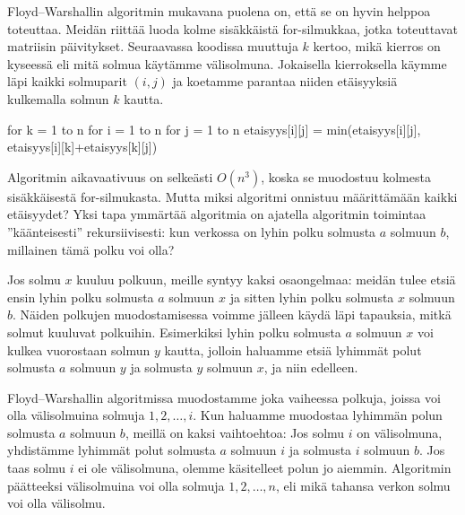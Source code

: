 Floyd–Warshallin algoritmin mukavana puolena on,
että se on hyvin helppoa toteuttaa.
Meidän riittää luoda kolme sisäkkäistä for-silmukkaa,
jotka toteuttavat matriisin päivitykset.
Seuraavassa koodissa muuttuja $k$ kertoo,
mikä kierros on kyseessä eli mitä solmua käytämme välisolmuna.
Jokaisella kierroksella käymme läpi kaikki solmuparit $(i,j)$
ja koetamme parantaa niiden etäisyyksiä kulkemalla solmun $k$ kautta.

\begin{code}
for k = 1 to n
    for i = 1 to n
        for j = 1 to n
            etaisyys[i][j] = min(etaisyys[i][j],
                                   etaisyys[i][k]+etaisyys[k][j])
\end{code}

Algoritmin aikavaativuus on selkeästi $O(n^3)$,
koska se muodostuu kolmesta sisäkkäisestä for-silmukasta.
Mutta miksi algoritmi onnistuu määrittämään kaikki etäisyydet?
Yksi tapa ymmärtää algoritmia on
ajatella algoritmin toimintaa ''käänteisesti'' rekursiivisesti:
kun verkossa on lyhin polku solmusta $a$ solmuun $b$,
millainen tämä polku voi olla?

Jos solmu $x$ kuuluu polkuun, meille syntyy kaksi osaongelmaa:
meidän tulee etsiä ensin lyhin polku solmusta $a$ solmuun $x$
ja sitten lyhin polku solmusta $x$ solmuun $b$.
Näiden polkujen muodostamisessa voimme jälleen käydä läpi tapauksia,
mitkä solmut kuuluvat polkuihin.
Esimerkiksi lyhin polku solmusta $a$ solmuun $x$
voi kulkea vuorostaan solmun $y$ kautta,
jolloin haluamme etsiä lyhimmät polut solmusta $a$ solmuun $y$
ja solmusta $y$ solmuun $x$, ja niin edelleen.

Floyd–Warshallin algoritmissa muodostamme joka vaiheessa
polkuja, joissa voi olla välisolmuina solmuja $1,2,\dots,i$.
Kun haluamme muodostaa lyhimmän polun solmusta $a$ solmuun $b$,
meillä on kaksi vaihtoehtoa:
Jos solmu $i$ on välisolmuna, yhdistämme lyhimmät polut
solmusta $a$ solmuun $i$ ja solmusta $i$ solmuun $b$.
Jos taas solmu $i$ ei ole välisolmuna, olemme käsitelleet
polun jo aiemmin.
Algoritmin päätteeksi välisolmuina voi olla solmuja $1,2,\dots,n$,
eli mikä tahansa verkon solmu voi olla välisolmu.